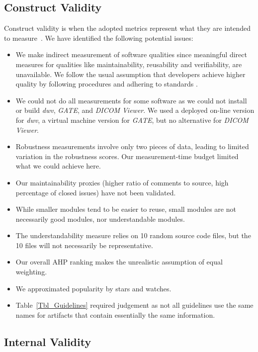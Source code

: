 \documentclass[doubleblind,12pt, 3p, times]{elsarticle}
\begin{document}
\subsection{Construct Validity}

Construct validity is when the adopted metrics represent what they are intended
to measure~\cite{RunesonAndHost2009}. We have identified the following
potential issues:
\begin{itemize}
\item We make indirect measurement of software qualities since meaningful direct
measures for qualities like maintainability, reusability and verifiability, are
unavailable.  We follow the usual assumption that developers achieve higher
quality by following procedures and adhering to standards \cite[p.\
112]{VanVliet2000}.
\item We could not do all measurements for some software as we could not
install or build \textit{dwv}, \textit{GATE}, and \textit{DICOM Viewer}. We
used a deployed on-line version for \textit{dwv}, a virtual machine version for
\textit{GATE}, but no alternative for \textit{DICOM Viewer}.
\item Robustness measurements involve only two pieces of data, leading to
limited variation in the robustness scores. Our measurement-time budget limited
what we could achieve here.
\item Our maintainability proxies (higher ratio of comments to source,
high percentage of closed issues) have not been validated.
\item While smaller modules tend to be easier to reuse, small modules are
not necessarily good modules, nor understandable modules.
\item The understandability measure relies on 10 random source code files, but
the 10 files will not necessarily be representative. 
\item Our overall AHP ranking makes the unrealistic assumption of equal
weighting.
\item We approximated popularity by stars and watches.
\item Table~\ref{Tbl_Guidelines} required judgement as
not all guidelines use the same names for artifacts that contain
essentially the same information.
\end{itemize}

\subsection{Internal Validity} \label{Sec_InternalValidity}
\end{document}
